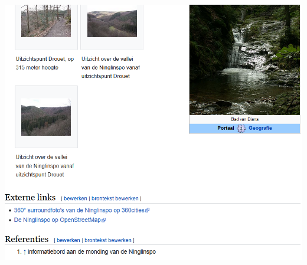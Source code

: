 \documentclass[presentatie.tex]{subfiles}
\begin{document}
\begin{frame}
\begin{columns}
\begin{column}{0.6\textwidth}
                \includegraphics[width=\linewidth,height=0.85\textheight,keepaspectratio]{assets/wikipediaVisual3}
            \end{column}
        \end{columns}
    \end{frame}
\end{document}
